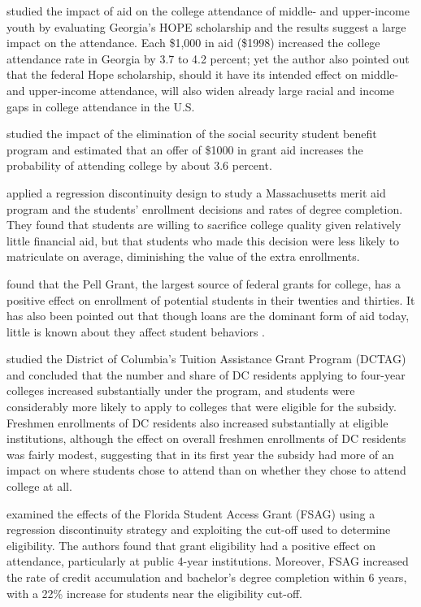 \documentclass[12pt,english]{report}
\begin{document}
\citet{Dynarski2000} studied the impact of aid on the college attendance of middle- and upper-income youth by evaluating Georgia's HOPE scholarship and the results suggest a large impact on the attendance. Each \$1,000 in aid (\$1998) increased the college attendance rate in Georgia by 3.7  to 4.2 percent; yet the author also pointed out that the federal Hope scholarship, should it have its intended effect on middle- and upper-income attendance, will also widen already large racial and income gaps in college attendance in the U.S.

\citet{Dynarski2003} studied the impact of the elimination of the social security student benefit program and estimated that an offer of \$1000 in grant aid increases the probability of  attending college by about 3.6 percent.

\citet{Cohodes2014} applied a regression discontinuity design to study a Massachusetts merit aid program and the students' enrollment decisions and rates of degree completion.  They found that students are willing to sacrifice college quality given relatively little financial aid, but that students who made this decision were less likely to matriculate on average, diminishing the value of the extra enrollments.

\citet{Turner2002} found that the Pell Grant, the largest source of federal grants for college, has a positive effect on enrollment of potential students in their twenties and thirties.  It has also been pointed out that though loans are the dominant form of aid today, little is known about they affect student behaviors \citep{Dynarski2013}. 

\citet{Abraham2006} studied the District of Columbia's Tuition Assistance Grant Program (DCTAG) and concluded that the number and share of DC residents applying to four-year colleges increased substantially under the program, and students were considerably more likely to apply to colleges that were eligible for the subsidy. Freshmen enrollments of DC residents also increased substantially at eligible institutions, although the effect on overall freshmen enrollments of DC residents was fairly modest, suggesting that in its first year the subsidy had more of an impact on where students chose to attend than on whether they chose to attend college at all.

\citet{Castleman2016} examined the effects of the Florida Student Access Grant (FSAG) using a regression discontinuity strategy and exploiting the cut-off used to determine eligibility. The authors found that grant eligibility had a positive effect on attendance, particularly at public 4-year institutions. Moreover, FSAG increased the rate of credit accumulation and bachelor's degree completion within 6 years, with a 22\% increase for students near the eligibility cut-off.
\end{document}
